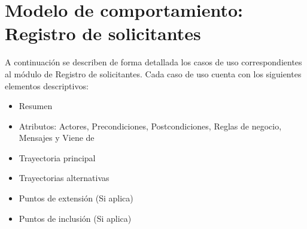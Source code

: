 
\chapter{Modelo de comportamiento: Registro de solicitantes}

	A continuación se describen de forma detallada los casos de uso correspondientes al módulo de Registro de solicitantes. Cada caso de uso cuenta con los siguientes elementos descriptivos:

	\begin{itemize}

		\item Resumen

		\item Atributos: Actores, Precondiciones, Postcondiciones, Reglas de negocio, Mensajes y Viene de

		\item Trayectoria principal

		\item Trayectorias alternativas

		\item Puntos de extensión (Si aplica)

		\item Puntos de inclusión (Si aplica)

	\end{itemize}

	

